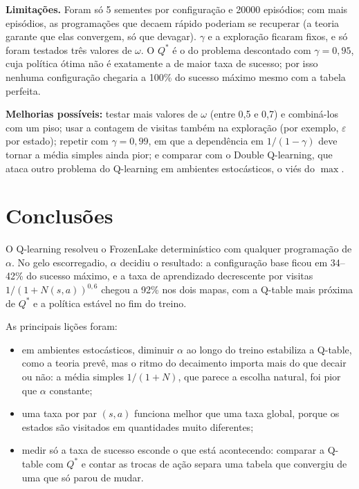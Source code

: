 \documentclass[11pt,a4paper]{article}
\begin{document}
\textbf{Limitações.} Foram só 5 sementes por configuração e 20000 episódios; com mais episódios, as programações que
decaem rápido poderiam se recuperar (a teoria garante que elas convergem, só que devagar). $\gamma$ e a exploração
ficaram fixos, e só foram testados três valores de $\omega$. O $Q^*$ é o do problema descontado com $\gamma = 0{,}95$,
cuja política ótima não é exatamente a de maior taxa de sucesso; por isso nenhuma configuração chegaria a 100\% do
sucesso máximo mesmo com a tabela perfeita.

\textbf{Melhorias possíveis:} testar mais valores de $\omega$ (entre 0,5 e 0,7) e combiná-los com um piso; usar a
contagem de visitas também na exploração (por exemplo, $\varepsilon$ por estado); repetir com $\gamma = 0{,}99$, em que a
dependência em $1/(1-\gamma)$ deve tornar a média simples ainda pior; e comparar com o Double Q-learning, que ataca outro
problema do Q-learning em ambientes estocásticos, o viés do $\max$.

\section{Conclusões}

O Q-learning resolveu o FrozenLake determinístico com qualquer programação de $\alpha$. No gelo escorregadio,
$\alpha$ decidiu o resultado: a configuração base ficou em 34--42\% do sucesso máximo, e a taxa de aprendizado
decrescente por visitas $1/(1+N(s,a))^{0,6}$ chegou a 92\% nos dois mapas, com a Q-table mais próxima de $Q^*$ e a
política estável no fim do treino.

As principais lições foram:
\begin{itemize}
  \item em ambientes estocásticos, diminuir $\alpha$ ao longo do treino estabiliza a Q-table, como a teoria prevê, mas o
    ritmo do decaimento importa mais do que decair ou não: a média simples $1/(1+N)$, que parece a escolha natural, foi
    pior que $\alpha$ constante;
  \item uma taxa por par $(s,a)$ funciona melhor que uma taxa global, porque os estados são visitados em quantidades
    muito diferentes;
  \item medir só a taxa de sucesso esconde o que está acontecendo: comparar a Q-table com $Q^*$ e contar as trocas de
    ação separa uma tabela que convergiu de uma que só parou de mudar.
\end{itemize}
\end{document}
